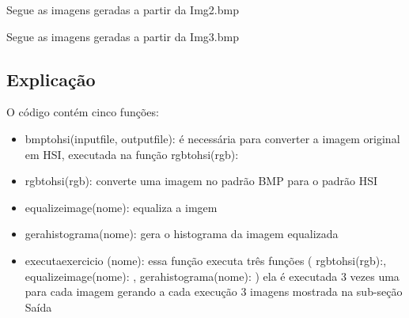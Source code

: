 \documentclass[10pt,a4paper]{article}
\begin{document}
Segue as imagens geradas a partir da Img2.bmp

\begin{figure}[H]
    \centering
    \qquad
    \qquad
    \qquad
\end{figure}

Segue as imagens geradas a partir da Img3.bmp

\begin{figure}[H]
    \centering
    \qquad
    \qquad
    \qquad
\end{figure}

\subsection{Explicação}

O código contém cinco funções:

\begin{itemize}
    \item {\ttfamily bmp\textunderscore to\textunderscore hsi(input\textunderscore file, output\textunderscore file):} é necessária para converter a imagem original em HSI, executada na função {\ttfamily rgb\textunderscore to\textunderscore hsi(rgb):}
    \item {\ttfamily rgb\textunderscore to\textunderscore hsi(rgb):} converte uma imagem no padrão BMP para o padrão HSI
    \item {\ttfamily equalize\textunderscore image(nome):} equaliza a imgem 
    \item {\ttfamily gera\textunderscore histograma(nome):} gera o histograma da imagem equalizada
    \item {\ttfamily executa\textunderscore exercicio (nome):} essa função executa três funções ( {\ttfamily rgb\textunderscore to\textunderscore hsi(rgb):}, {\ttfamily equalize\textunderscore image(nome):} , {\ttfamily gera\textunderscore histograma(nome):} ) ela é executada 3 vezes uma para cada imagem gerando a cada execução 3 imagens mostrada na sub-seção Saída
\end{itemize}
\end{document}
